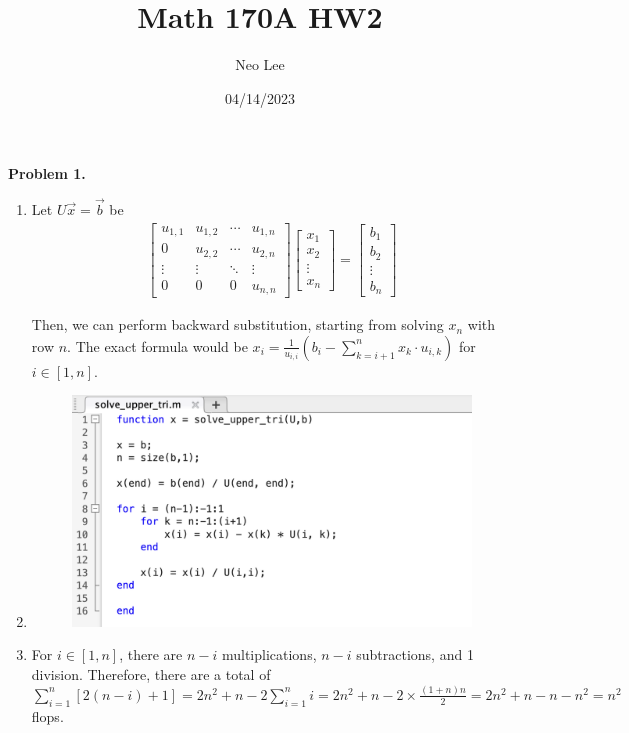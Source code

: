 \documentclass{article}
\title{Math 170A HW2}
\author{Neo Lee}
\date{04/14/2023}
\begin{document}
 

\maketitle 

\textbf{Problem 1.}
\begin{enumerate}[label={\alph*)}]
    \item 
    Let $U\vec{x}=\vec{b}$ be
    \begin{align}
        \begin{bmatrix}
            u_{1,1} & u_{1,2} & \cdots & u_{1,n} \\
            0 & u_{2,2} & \cdots & u_{2,n} \\
            \vdots & \vdots & \ddots & \vdots \\
            0 & 0 & 0 & u_{n,n}
        \end{bmatrix}
        \begin{bmatrix}
            x_1 \\
            x_2 \\
            \vdots \\
            x_n
        \end{bmatrix}
        = 
        \begin{bmatrix}
            b_1 \\
            b_2 \\
            \vdots \\
            b_n
        \end{bmatrix}
        \nonumber
    \end{align}

    Then, we can perform backward substitution, starting from solving $x_n$ with row $n$.
    The exact formula would be $x_i = \frac{1}{u_{i,i}}\left(b_i - \sum\limits_{k=i+1}^nx_k\cdot u_{i,k}\right)$ for $i \in [1,n]$.

    \item \qquad
    \begin{figure}[h]
        \centering
        \includegraphics*[scale=0.5]{solve_upper_tri.png}
    \end{figure}

    \item
    For $i \in [1,n]$, there are $n-i$ multiplications, $n-i$ subtractions, and 1 division.
    Therefore, there are a total of $\sum\limits_{i=1}^n[2(n-i) + 1] = 2n^2 + n -2\sum\limits_{i=1}^{n}i=2n^2+n-2\times\frac{(1+n)n}{2} = 2n^2+n-n-n^2=n^2$ flops.
\end{enumerate}
\end{document}
